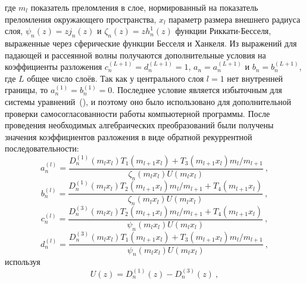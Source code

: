 где $m_l$ показатель преломления в слое, нормированный на показатель
преломления окружающего пространства, $x_l$ параметр размера внешнего
радиуса слоя, $\psi_{n}(z) = z j_n(z)$ и $\zeta_{n}(z) = z h_n^1(z)$
функции Риккати-Бесселя, выраженные через сферические функции Бесселя
и Ханкеля.  Из выражений для падающей и рассеянной волны получаются
дополнительные условия на коэффициенты разложения
$c_n^{(L+1)}=d_n^{(L+1)}=1$, $a_n=a_n^{(L+1)}$ и $b_n=b_n^{(L+1)}$,
где $L$ общее число слоёв. Так как у центрального слоя $l=1$ нет
внутренней границы, то $a_n^{(1)}=b_n^{(1)}=0$. Последнее условие
является избыточным для системы
уравнений~(), и поэтому оно
было использовано для дополнительной проверки самосогласованности
работы компьютерной программы.  После проведения необходимых
алгебраических преобразований были получены значения коэффициентов
разложения в виде обратной рекуррентной последовательности:
\begin{equation}
\label{eq:6p1}
a^{(l)}_n = \frac
{
    {D^{(1)}_{n}}{\left (m_{l} x_{l} \right )}
    T_1\left (m_{l+1} x_{l} \right )
    +
    T_3\left (m_{l+1} x_{l} \right )
    m_{l}/m_{l+1}
}
{
   \zeta_{n}\left (m_{l} x_{l} \right )
   U\left (m_{l} x_{l} \right )
}\:,
\end{equation}
\begin{equation}
\label{eq:6p2}
b^{(l)}_n = \frac
{
    {D^{(1)}_{n}}{\left (m_{l} x_{l} \right )}
    T_2\left (m_{l+1} x_{l} \right )
    m_{l}/m_{l+1}
    +
    T_4\left (m_{l+1} x_{l} \right )
}
{
   \zeta_{n}\left (m_{l} x_{l} \right )
   U\left (m_{l} x_{l} \right )
}\:,
\end{equation}
\begin{equation}
\label{eq:6p3}
c^{(l)}_n = \frac
{
    {D^{(3)}_{n}}{\left (m_{l} x_{l} \right )}
    T_2\left (m_{l+1} x_{l} \right )
    m_{l}/m_{l+1}
    +
    T_4\left (m_{l+1} x_{l} \right )
}
{
   \psi_{n}\left (m_{l} x_{l} \right )
   U\left (m_{l} x_{l} \right )
}\:,
\end{equation}
\begin{equation}
\label{eq:6p4}
d^{(l)}_n = \frac
{
    {D^{(3)}_{n}}{\left (m_{l} x_{l} \right )}
    T_1\left (m_{l+1} x_{l} \right )
    +
    T_3\left (m_{l+1} x_{l} \right )
    m_{l}/m_{l+1}
}
{
   \psi_{n}\left (m_{l} x_{l} \right )
   U\left (m_{l} x_{l} \right )
}\:,
\end{equation}
используя
\begin{equation*}
  U(z) =    {D^{(1)}_{n}}(z) - {D^{(3)}_{n}}(z)\:,
\end{equation*}
